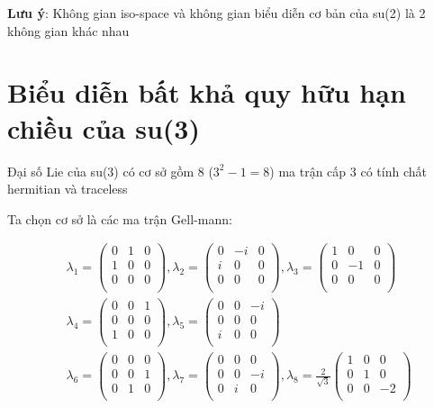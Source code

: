 \documentclass{report}
\begin{document}
\textbf{Lưu ý}: Không gian iso-space và không gian biểu diễn cơ bản của su(2) là 2 không gian khác nhau

\section{Biểu diễn bất khả quy hữu hạn chiều của su(3)}

Đại số Lie của su(3) có cơ sở gồm 8 (\(3^{2} - 1 = 8\)) ma trận cấp 3 có tính chất  hermitian và traceless

Ta chọn cơ sở là các ma trận Gell-mann:

	\begin{align*}
		& \lambda_{1} = \begin{pmatrix}
			0 & 1 & 0 \\
			1 & 0 & 0 \\
			0 & 0 & 0 \\
		\end{pmatrix}, \lambda_{2} = \begin{pmatrix}
			0 & -i & 0 \\
			i & 0 & 0 \\
			0 & 0 & 0 \\
		\end{pmatrix}, \lambda_{3} = \begin{pmatrix}
			1 & 0 & 0 \\
			0 & -1 & 0 \\
			0 & 0 & 0 \\
		\end{pmatrix} \\
		& \lambda_{4} =\begin{pmatrix}
			0 & 0 & 1 \\
			0 & 0 & 0 \\
			1 & 0 & 0 \\
		\end{pmatrix}, \lambda_{5} = \begin{pmatrix}
			0 & 0 & -i \\
			0 & 0 & 0 \\
			i & 0 & 0 \\
		\end{pmatrix} \\
		& \lambda_{6} = \begin{pmatrix}
			0 & 0 & 0 \\
			0 & 0 & 1 \\
			0 & 1 & 0 \\
		\end{pmatrix}, \lambda_{7} = \begin{pmatrix}
			0 & 0 & 0 \\
			0 & 0 & -i \\
			0 & i & 0 \\
		\end{pmatrix}, \lambda_{8} = \frac{2}{\sqrt{3}} \begin{pmatrix}
			1 & 0 & 0 \\
			0 & 1 & 0 \\
			0 & 0 & -2 \\
		\end{pmatrix} \\
	\end{align*}
		
\end{document}
